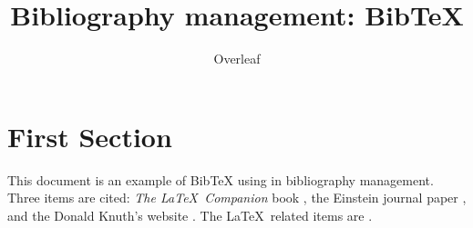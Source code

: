 \documentclass[a4paper,10pt]{article}
\title{Bibliography management: BibTeX}
\author{Overleaf}
\begin{document}
	
	\maketitle
	
	\tableofcontents
	
	\medskip
	
	\section{First Section}
	This document is an example of BibTeX using in bibliography management. Three items are cited: \textit{The \LaTeX\ Companion} book \cite{latexcompanion}, the Einstein journal paper \cite{einstein}, and the Donald Knuth's website \cite{knuthwebsite}. The \LaTeX\ related items are \cite{latexcompanion,knuthwebsite}. 
	
	\medskip
	
	
	
	\printbibliography
\end{document}
